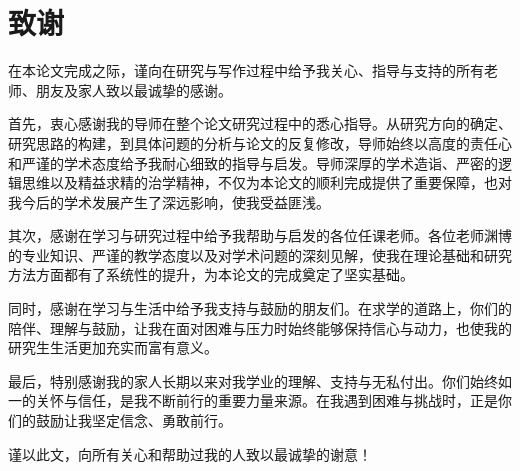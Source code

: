 
\chapter{致谢}
在本论文完成之际，谨向在研究与写作过程中给予我关心、指导与支持的所有老师、朋友及家人致以最诚挚的感谢。

首先，衷心感谢我的导师在整个论文研究过程中的悉心指导。从研究方向的确定、研究思路的构建，到具体问题的分析与论文的反复修改，导师始终以高度的责任心和严谨的学术态度给予我耐心细致的指导与启发。导师深厚的学术造诣、严密的逻辑思维以及精益求精的治学精神，不仅为本论文的顺利完成提供了重要保障，也对我今后的学术发展产生了深远影响，使我受益匪浅。

其次，感谢在学习与研究过程中给予我帮助与启发的各位任课老师。各位老师渊博的专业知识、严谨的教学态度以及对学术问题的深刻见解，使我在理论基础和研究方法方面都有了系统性的提升，为本论文的完成奠定了坚实基础。

同时，感谢在学习与生活中给予我支持与鼓励的朋友们。在求学的道路上，你们的陪伴、理解与鼓励，让我在面对困难与压力时始终能够保持信心与动力，也使我的研究生生活更加充实而富有意义。

最后，特别感谢我的家人长期以来对我学业的理解、支持与无私付出。你们始终如一的关怀与信任，是我不断前行的重要力量来源。在我遇到困难与挑战时，正是你们的鼓励让我坚定信念、勇敢前行。

谨以此文，向所有关心和帮助过我的人致以最诚挚的谢意！


